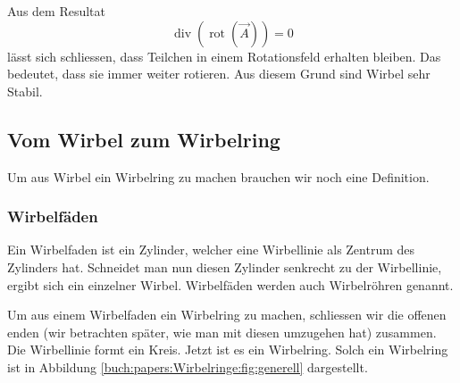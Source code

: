 Aus dem Resultat
\begin{equation}
    \label{paper:Wirbelringe:eq:wIdent}
\operatorname{div} ( \operatorname{rot} ( \vec{A} ) ) 
= 
0
\end{equation}
lässt sich schliessen, dass Teilchen in einem Rotationsfeld erhalten bleiben. 
Das bedeutet, dass sie immer weiter rotieren. 
Aus diesem Grund sind Wirbel sehr Stabil.

\subsection{Vom Wirbel zum Wirbelring}

Um aus Wirbel ein Wirbelring zu machen brauchen wir noch eine Definition.

\subsubsection*{Wirbelfäden}

Ein Wirbelfaden ist ein Zylinder, welcher eine Wirbellinie als Zentrum des Zylinders hat. 
Schneidet man nun diesen Zylinder senkrecht zu der Wirbellinie, ergibt sich ein einzelner Wirbel. 
Wirbelfäden werden auch Wirbelröhren genannt.

Um aus einem Wirbelfaden ein Wirbelring zu machen, schliessen wir die offenen enden (wir betrachten später, wie man mit diesen umzugehen hat) zusammen.
Die Wirbellinie formt ein Kreis.
Jetzt ist es ein Wirbelring. 
Solch ein Wirbelring ist in Abbildung \ref{buch:papers:Wirbelringe:fig:generell} dargestellt.


